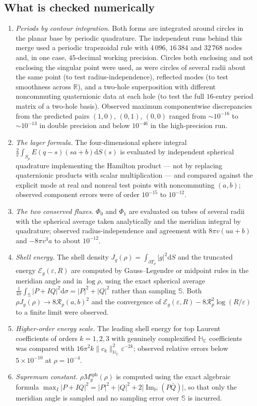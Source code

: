 \documentclass[11pt,a4paper]{article}
\numberwithin{equation}{section}
\theoremstyle{definition}
\theoremstyle{remark}
\theoremstyle{plain}
\newcommand{\HH}{\mathbb H}
\newcommand{\HC}{\mathbb H_{\mathbb C}}
\newcommand{\RR}{\mathbb R}
\newcommand{\SSS}{\mathbb S}
\DeclareMathOperator{\Ima}{Im}
\newcommand{\ImH}{\Ima_{\HH}}
\newcommand{\Sp}{S_{p}}
\newcommand{\Rp}{\mathcal R_{p}}      %
\newcommand{\Msph}{M^{\mathrm{sph}}}                  %
\newcommand{\Eg}{\mathcal E_{g}}
\newcommand{\Jg}{J_{g}}
\newcommand{\Tube}{T}
\newcommand{\abs}[1]{\lvert #1\rvert}
\newcommand{\norm}[1]{\lVert #1\rVert}
\newcommand{\dd}{\mathrm d}
\begin{document}
\subsection{What is checked numerically}
\label{f:sub:numeric}

\begin{enumerate}[label=\textup{(N\arabic*)}]
\item \emph{Periods by contour integration.} Both forms are integrated
around circles in the planar base by periodic quadrature. The independent
runs behind this merge used a periodic trapezoidal rule with
$4\,096$, $16\,384$ and $32\,768$ nodes and, in one case, $45$-decimal
working precision. Circles both enclosing and not enclosing the singular
point were used, as were circles of several radii about the same point
(to test radius-independence), reflected modes (to test smoothness across
$\RR$), and a two-hole superposition with different noncommuting
quaternionic data at each hole (to test the full $16$-entry period matrix
of a two-hole basis). Observed maximum componentwise discrepancies from
the predicted pairs $(1,0)$, $(0,1)$, $(0,0)$ ranged from
$\sim10^{-16}$ to $\sim10^{-13}$ in double precision and below $10^{-46}$
in the high-precision run.
\item \emph{The layer formula.} The four-dimensional sphere integral
$\frac2v\int_{\Sp}E(q-s)(sa+b)\dd S(s)$ is evaluated by independent
spherical quadrature implementing the Hamilton product --- not by replacing
quaternionic products with scalar multiplication --- and compared against
the explicit mode at real and nonreal test points with noncommuting
$(a,b)$; observed component errors were of order $10^{-15}$ to $10^{-12}$.
\item \emph{The two conserved fluxes.} $\Phi_0$ and $\Phi_1$ are evaluated
on tubes of several radii with the spherical average taken analytically and
the meridian integral by quadrature; observed radius-independence and
agreement with $8\pi v(ua+b)$ and $-8\pi v^3a$ to about $10^{-12}$.
\item \emph{Shell energy.} The shell density
$\Jg(\rho)=\int_{\partial \Tube_\rho}\abs g^2\dd S$ and the truncated
energy $\Eg(\varepsilon,R)$ are computed by Gauss--Legendre or midpoint
rules in the meridian angle and in $\log\rho$, using the exact spherical
average $\frac1{4\pi}\int_{\SSS}\abs{P+IQ}^2\dd\sigma=\abs P^2+\abs Q^2$
rather than sampling $\SSS$. Both $\rho\Jg(\rho)\to8\Rp(a,b)^2$ and the
convergence of $\Eg(\varepsilon,R)-8\Rp^2\log(R/\varepsilon)$ to a finite
limit were observed.
\item \emph{Higher-order energy scale.} The leading shell energy for top
Laurent coefficients of orders $k=1,2,3$ with genuinely complexified
$\HC$ coefficients was compared with $16\pi^2k\norm{c_k}^2_{\HC}
\varepsilon^{-2k}$; observed relative errors below $5\times10^{-10}$ at
$\rho=10^{-4}$.
\item \emph{Supremum constant.} $\rho\Msph_g(\rho)$ is computed using the
exact algebraic formula
$\max_{I}\abs{P+IQ}^2=\abs P^2+\abs Q^2+2\abs{\ImH(P\bar Q)}$, so that only
the meridian angle is sampled and no sampling error over $\SSS$ is
incurred.
\end{enumerate}
\end{document}
